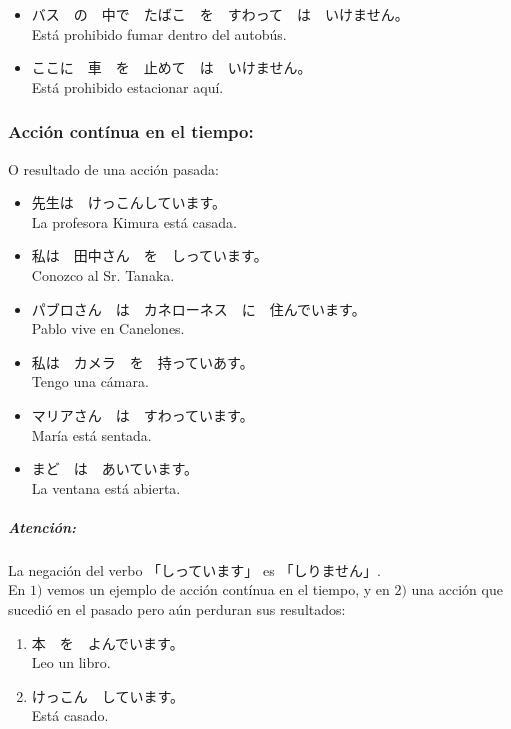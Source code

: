 \documentclass[a4paper,12pt,oneside]{report}
\def\bv{\textbf{V}} %
\begin{document}
\begin{CJK*}{UTF8}{min}
        \begin{itemize}
          \item バス　の　中で　たばこ　を　すわって　は　いけません。\\
                Est\'a prohibido fumar dentro del autob\'us.
          \item ここに　車　を　止めて　は　いけません。\\
                Est\'a prohibido estacionar aqu\'i.
        \end{itemize}

      \subsubsection{Acci\'on cont\'inua en el tiempo:}
        O resultado de una acci\'on pasada:\\

        \fbox{\bv(て) います}

        \begin{itemize}
          \item {}先生は　けっこんしています。\\
                La profesora Kimura est\'a casada.
          \item 私は　田中さん　を　しっています。\\
                Conozco al Sr. Tanaka.
          \item パブロさん　は　カネローネス　に　住んでいます。\\
                Pablo vive en Canelones.
          \item 私は　カメラ　を　持っていあす。\\
                Tengo una c\'amara.
          \item マリアさん　は　すわっています。\\
                Mar\'ia est\'a sentada.
          \item まど　は　あいています。\\
                La ventana est\'a abierta.
        \end{itemize}

        \subparagraph{Atenci\'on:}
          La negaci\'on del verbo 「しっています」 es 「しりません」.\\

        En $1)$ vemos un ejemplo de acci\'on cont\'inua en el tiempo, y en $2)$ una acci\'on que sucedi\'o en el pasado pero a\'un perduran sus resultados:

        \begin{enumerate}
          \item 本　を　よんでいます。\\
                Leo un libro.
          \item けっこん　しています。\\
                Est\'a casado.
        \end{enumerate}


\end{CJK*}
\end{document}

